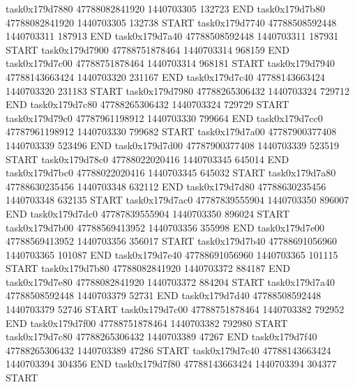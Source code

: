 task0x179d7880 47788082841920          1440703305               132723  END
task0x179d7b80 47788082841920          1440703305               132738  START
task0x179d7740 47788508592448          1440703311               187913  END
task0x179d7a40 47788508592448          1440703311               187931  START
task0x179d7900 47788751878464          1440703314               968159  END
task0x179d7c00 47788751878464          1440703314               968181  START
task0x179d7940 47788143663424          1440703320               231167  END
task0x179d7c40 47788143663424          1440703320               231183  START
task0x179d7980 47788265306432          1440703324               729712  END
task0x179d7c80 47788265306432          1440703324               729729  START
task0x179d79c0 47787961198912          1440703330               799664  END
task0x179d7cc0 47787961198912          1440703330               799682  START
task0x179d7a00 47787900377408          1440703339               523496  END
task0x179d7d00 47787900377408          1440703339               523519  START
task0x179d78c0 47788022020416          1440703345               645014  END
task0x179d7bc0 47788022020416          1440703345               645032  START
task0x179d7a80 47788630235456          1440703348               632112  END
task0x179d7d80 47788630235456          1440703348               632135  START
task0x179d7ac0 47787839555904          1440703350               896007  END
task0x179d7dc0 47787839555904          1440703350               896024  START
task0x179d7b00 47788569413952          1440703356               355998  END
task0x179d7e00 47788569413952          1440703356               356017  START
task0x179d7b40 47788691056960          1440703365               101087  END
task0x179d7e40 47788691056960          1440703365               101115  START
task0x179d7b80 47788082841920          1440703372               884187  END
task0x179d7e80 47788082841920          1440703372               884204  START
task0x179d7a40 47788508592448          1440703379                52731  END
task0x179d7d40 47788508592448          1440703379                52746  START
task0x179d7c00 47788751878464          1440703382               792952  END
task0x179d7f00 47788751878464          1440703382               792980  START
task0x179d7c80 47788265306432          1440703389                47267  END
task0x179d7f40 47788265306432          1440703389                47286  START
task0x179d7c40 47788143663424          1440703394               304356  END
task0x179d7f80 47788143663424          1440703394               304377  START
